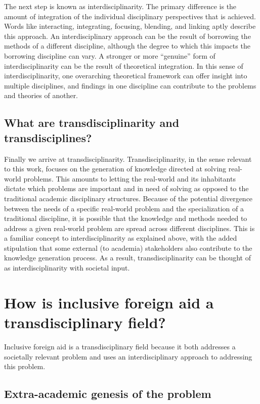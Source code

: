 \documentclass[a4paper]{article}
\begin{document}
The next step is known as interdisciplinarity. The primary difference is the
amount of integration of the individual disciplinary perspectives that is
achieved. Words like interacting, integrating, focusing, blending, and linking
aptly describe this approach. An interdisciplinary approach can be the result
of borrowing the methods of a different discipline, although the degree to
which this impacts the borrowing discipline can vary. A stronger or more
``genuine'' form of interdisciplinarity can be the result of theoretical
integration. In this sense of interdisciplinarity, one overarching theoretical
framework can offer insight into multiple disciplines, and findings in one
discipline can contribute to the problems and theories of another.


\subsection{What are transdisciplinarity and transdisciplines?}

Finally we arrive at transdisciplinarity. Transdisciplinarity, in the sense
relevant to this work, focuses on the generation of knowledge directed at
solving real-world problems. This amounts to letting the real-world and its
inhabitants dictate which problems are important and in need of solving as
opposed to the traditional academic disciplinary structures. Because of the
potential divergence between the needs of a specific real-world problem and
the specialization of a traditional discipline, it is possible that the
knowledge and methods needed to address a given real-world problem are spread
across different disciplines. This is a familiar concept to
interdisciplinarity as explained above, with the added stipulation that some
external (to academia) stakeholders also contribute to the knowledge
generation process. As a result, transdisciplinarity can be thought of as
interdisciplinarity with societal input. 

\section{How is inclusive foreign aid a transdisciplinary field?}

Inclusive foreign aid is a transdisciplinary field because it both addresses a
societally relevant problem and uses an interdisciplinary approach to
addressing this problem. 

\subsection{Extra-academic genesis of the problem}
\end{document}
